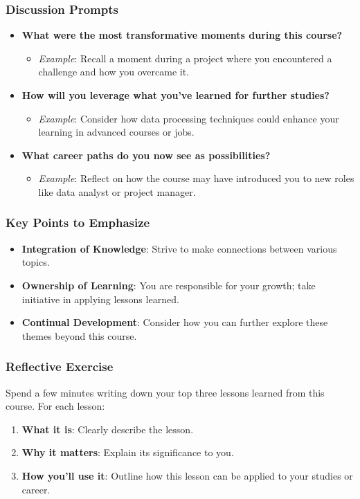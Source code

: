 \documentclass[aspectratio=169]{beamer}
\begin{document}
\begin{frame}[fragile]
    \frametitle{Discussion Prompts}
    \begin{itemize}
        \item \textbf{What were the most transformative moments during this course?}
            \begin{itemize}
                \item \textit{Example}: Recall a moment during a project where you encountered a challenge and how you overcame it. 
            \end{itemize} 
        \item \textbf{How will you leverage what you've learned for further studies?}
            \begin{itemize}
                \item \textit{Example}: Consider how data processing techniques could enhance your learning in advanced courses or jobs.
            \end{itemize} 
        \item \textbf{What career paths do you now see as possibilities?}
            \begin{itemize}
                \item \textit{Example}: Reflect on how the course may have introduced you to new roles like data analyst or project manager.
            \end{itemize}
    \end{itemize}
\end{frame}

\begin{frame}[fragile]
    \frametitle{Key Points to Emphasize}
    \begin{itemize}
        \item \textbf{Integration of Knowledge}: Strive to make connections between various topics.
        \item \textbf{Ownership of Learning}: You are responsible for your growth; take initiative in applying lessons learned.
        \item \textbf{Continual Development}: Consider how you can further explore these themes beyond this course.
    \end{itemize}
\end{frame}

\begin{frame}[fragile]
    \frametitle{Reflective Exercise}
    Spend a few minutes writing down your top three lessons learned from this course. For each lesson:
    \begin{enumerate}
        \item \textbf{What it is}: Clearly describe the lesson.
        \item \textbf{Why it matters}: Explain its significance to you.
        \item \textbf{How you’ll use it}: Outline how this lesson can be applied to your studies or career.
    \end{enumerate}
\end{frame}
\end{document}
